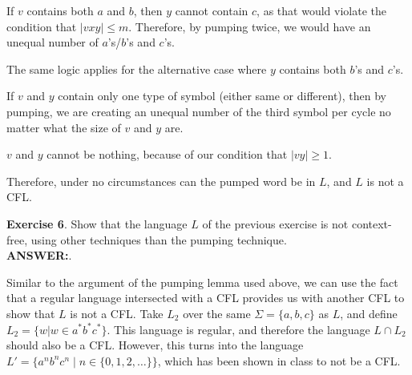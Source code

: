 \documentclass{article}
\begin{document}
If $v$ contains both $a$ and $b$, then $y$ cannot contain $c$, as that would violate the condition that $|vxy| \leq m$. Therefore, by pumping twice, we would have an unequal number of $a$'s/$b$'s and $c$'s.  

The same logic applies for the alternative case where $y$ contains both $b$'s and $c$'s. 

If $v$ and $y$ contain only one type of symbol (either same or different), then by pumping, we are creating an unequal number of the third symbol per cycle no matter what the size of $v$ and $y$ are. 

$v$ and $y$ cannot be nothing, because of our condition that $|vy| \geq 1$.

Therefore, under no circumstances can the pumped word be in $L$, and $L$ is not a CFL.

\textbf{Exercise 6}. Show that the language $L$ of the previous exercise is not
context-free, using other techniques than the pumping technique.\\

\textbf{ANSWER:}.

Similar to the argument of the pumping lemma used above, we can use the fact that a regular language intersected with a CFL provides us with another CFL to show that $L$ is not a CFL. Take $L_2$ over the same $\Sigma = \{a, b, c\}$ as $L$, and define $L_2 = \{w | w \in a^*b^*c^*\}$. This language is regular, and therefore the language $L \cap L_2$ should also be a CFL. However, this turns into the language $L' = \{a^nb^nc^n \mid n \in \{0, 1, 2, \ldots\}\}$, which has been shown in class to not be a CFL.
\end{document}
